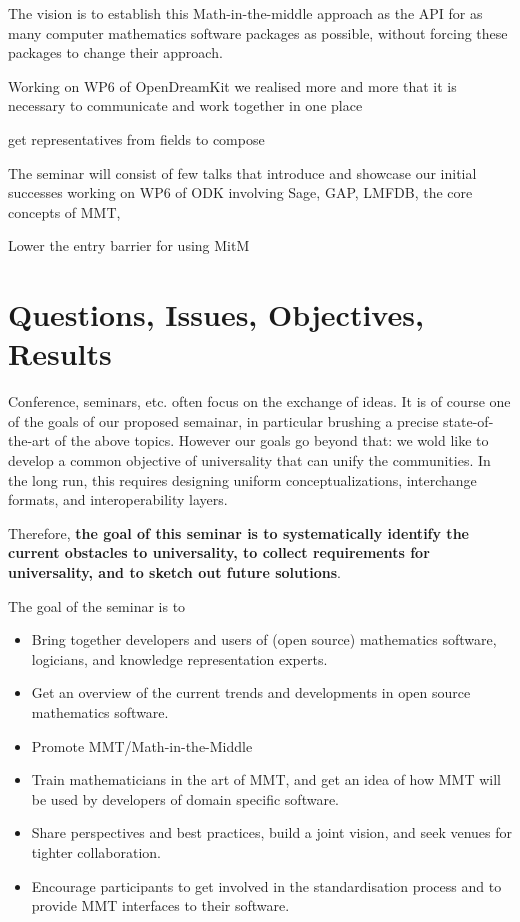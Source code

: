 The vision is to establish this Math-in-the-middle approach as the API for as
many computer mathematics software packages as possible, without forcing these
packages to change their approach.

Working on WP6 of OpenDreamKit we realised more and more that it is necessary to
communicate and work together in one place

get representatives from fields to compose

The seminar will consist of few talks that introduce and showcase our initial
successes working on WP6 of ODK involving Sage, GAP, LMFDB, the core concepts
of MMT,

Lower the entry barrier for using MitM

\section{Questions, Issues, Objectives, Results}

Conference, seminars, etc. often focus on the exchange of ideas. It is of course
one of the goals of our proposed semainar, in particular brushing a precise
state-of-the-art of the above topics. However our goals go beyond that: we wold
like to develop a common objective of universality that can unify the
communities. In the long run, this requires designing uniform
conceptualizations, interchange formats, and interoperability layers.

Therefore, \textbf{the goal of this seminar is to systematically identify the
current obstacles to universality, to collect requirements for universality, and
to sketch out future solutions}.

The goal of the seminar is to 
\begin{itemize}
\item Bring together developers and users of (open source) mathematics software,
  logicians, and knowledge representation experts.
\item Get an overview of the current trends and developments in open source
  mathematics software.
\item Promote MMT/Math-in-the-Middle
\item Train mathematicians in the art of MMT, and get an idea of how MMT will be
  used by developers of domain specific software.
\item Share perspectives and best practices, build a joint vision, and
  seek venues for tighter collaboration.
\item Encourage participants to get involved in the standardisation process and
  to provide MMT interfaces to their software.
\end{itemize}

